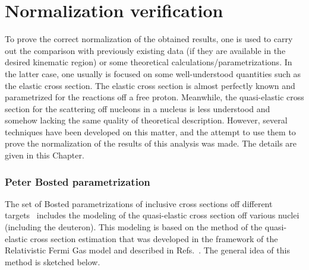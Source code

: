 \chapter{Normalization verification}
\label{Sect:norm}

To prove the correct normalization of the obtained results, one is used to carry out the comparison with previously existing data (if they are available in the desired kinematic region) or some theoretical calculations/parametrizations. In the latter case, one usually is focused on some well-understood quantities such as the elastic cross section. The elastic cross section is almost perfectly known and parametrized for the reactions off a free proton. Meanwhile, the quasi-elastic cross section for the scattering off nucleons in a nucleus is less understood and somehow lacking the same quality of theoretical description. However, several techniques have been developed on this matter, and the attempt to use them to prove the normalization of the results of this analysis was made. The details are given in this Chapter.


\subsection*{ Peter Bosted parametrization}

The set of Bosted parametrizations of inclusive cross sections off different targets~\cite{Bosted_fit,Bosted:2007xd} includes the modeling of the quasi-elastic cross section off various nuclei (including the deuteron). This modeling is based on the method of the quasi-elastic cross section estimation that was developed in the framework of the Relativistic Fermi Gas model and described in Refs.~\cite{Amaro:2004bs,Alberico:1988bv,Donnelly:1998xg}. The general idea of this method is sketched below. 

